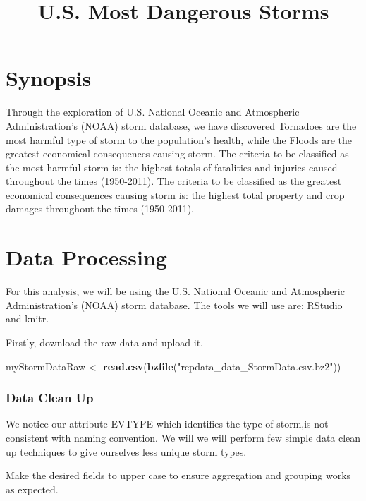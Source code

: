 \documentclass[]{article}
\title{U.S. Most Dangerous Storms}
\author{}
\date{}
\newenvironment{Shaded}{\begin{snugshade}}{\end{snugshade}}
\newcommand{\KeywordTok}[1]{\textcolor[rgb]{0.13,0.29,0.53}{\textbf{{#1}}}}
\newcommand{\StringTok}[1]{\textcolor[rgb]{0.31,0.60,0.02}{{#1}}}
\newcommand{\NormalTok}[1]{{#1}}
\begin{document}
\maketitle


\section{Synopsis}\label{synopsis}

Through the exploration of U.S. National Oceanic and Atmospheric
Administration's (NOAA) storm database, we have discovered Tornadoes are
the most harmful type of storm to the population's health, while the
Floods are the greatest economical consequences causing storm. The
criteria to be classified as the most harmful storm is: the highest
totals of fatalities and injuries caused throughout the times
(1950-2011). The criteria to be classified as the greatest economical
consequences causing storm is: the highest total property and crop
damages throughout the times (1950-2011).

\section{Data Processing}\label{data-processing}

For this analysis, we will be using the U.S. National Oceanic and
Atmospheric Administration's (NOAA) storm database. The tools we will
use are: RStudio and knitr.

Firstly, download the raw data and upload it.

\begin{Shaded}
\begin{Highlighting}[]
\NormalTok{myStormDataRaw <-}\StringTok{ }\KeywordTok{read.csv}\NormalTok{(}\KeywordTok{bzfile}\NormalTok{(}\StringTok{"repdata_data_StormData.csv.bz2"}\NormalTok{))}
\end{Highlighting}
\end{Shaded}

\subsubsection{Data Clean Up}\label{data-clean-up}

We notice our attribute EVTYPE which identifies the type of storm,is not
consistent with naming convention. We will we will perform few simple
data clean up techniques to give ourselves less unique storm types.

Make the desired fields to upper case to ensure aggregation and grouping
works as expected.
\end{document}
